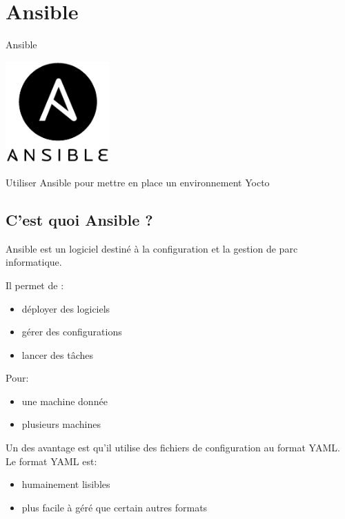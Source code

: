 \documentclass[compress]{smilebeamer}
\begin{document}
\section{Ansible}

\begin{frame}{Ansible}
\end{frame}

\begin{frame}
\begin{center}
\includegraphics[width=0.3\textwidth]{logos/Ansible.png}
\end{center}
\begin{center}
\textcolor{smileOrange}{\huge{Utiliser Ansible pour mettre en place un environnement Yocto}}
\end{center}
\end{frame}

\subsection{C'est quoi Ansible ?}

\begin{frame}
\begin{definition}
Ansible est un logiciel destiné à la configuration et la gestion de parc informatique.
\end{definition}
Il permet de :
\begin{itemize}
	\item déployer des logiciels
	\item gérer des configurations
	\item lancer des tâches
\end{itemize}
Pour:
\begin{itemize}
	\item une machine donnée
	\item plusieurs machines
\end{itemize}
\end{frame}

\begin{frame}
Un des avantage est qu'il utilise des fichiers de configuration au format YAML.\newline
\newline
Le format YAML est:
\begin{itemize}
	\item humainement lisibles
	\item plus facile à géré que certain autres formats %
\end{itemize}
\end{frame}
\end{document}
